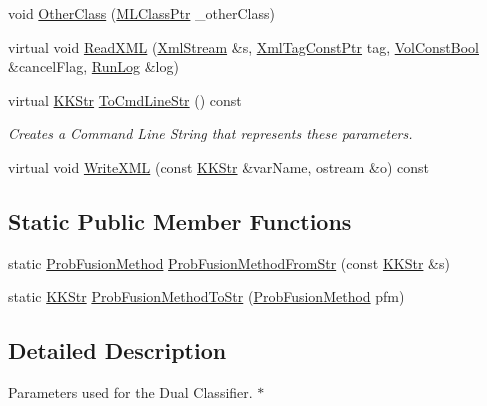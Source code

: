 \begin{DoxyCompactItemize}
void \hyperlink{class_k_k_m_l_l_1_1_model_param_dual_afb94ad207c21bec2c6a56dfb33de2386}{Other\+Class} (\hyperlink{namespace_k_k_m_l_l_ac272393853d59e72e8456f14cd6d8c23}{M\+L\+Class\+Ptr} \+\_\+other\+Class)
\item 
virtual void \hyperlink{class_k_k_m_l_l_1_1_model_param_dual_aab4c499ddc06789ad9f51eeb0213401f}{Read\+X\+ML} (\hyperlink{class_k_k_b_1_1_xml_stream}{Xml\+Stream} \&s, \hyperlink{namespace_k_k_b_a5f1b0b1667d79fec26deeff10c43df23}{Xml\+Tag\+Const\+Ptr} tag, \hyperlink{namespace_k_k_b_a7d390f568e2831fb76b86b56c87bf92f}{Vol\+Const\+Bool} \&cancel\+Flag, \hyperlink{class_k_k_b_1_1_run_log}{Run\+Log} \&log)
\item 
virtual \hyperlink{class_k_k_b_1_1_k_k_str}{K\+K\+Str} \hyperlink{class_k_k_m_l_l_1_1_model_param_dual_ac60d7249bbd474220b45534335a0b389}{To\+Cmd\+Line\+Str} () const 
\begin{DoxyCompactList}\small\item\em Creates a Command Line String that represents these parameters. \end{DoxyCompactList}\item 
virtual void \hyperlink{class_k_k_m_l_l_1_1_model_param_dual_aac80a5c4dbdd177e9d52dab25c22504f}{Write\+X\+ML} (const \hyperlink{class_k_k_b_1_1_k_k_str}{K\+K\+Str} \&var\+Name, ostream \&o) const 
\end{DoxyCompactItemize}
\subsection*{Static Public Member Functions}
\begin{DoxyCompactItemize}
\item 
static \hyperlink{class_k_k_m_l_l_1_1_model_param_dual_a15565502cd267eb5c34afd4fd08930af}{Prob\+Fusion\+Method} \hyperlink{class_k_k_m_l_l_1_1_model_param_dual_a7d3cfcefe1290cf84a76c1ffaad21d92}{Prob\+Fusion\+Method\+From\+Str} (const \hyperlink{class_k_k_b_1_1_k_k_str}{K\+K\+Str} \&s)
\item 
static \hyperlink{class_k_k_b_1_1_k_k_str}{K\+K\+Str} \hyperlink{class_k_k_m_l_l_1_1_model_param_dual_ab51c6549d440fbc01a53d68447c3ae95}{Prob\+Fusion\+Method\+To\+Str} (\hyperlink{class_k_k_m_l_l_1_1_model_param_dual_a15565502cd267eb5c34afd4fd08930af}{Prob\+Fusion\+Method} pfm)
\end{DoxyCompactItemize}


\subsection{Detailed Description}
Parameters used for the Dual Classifier. $\ast$

